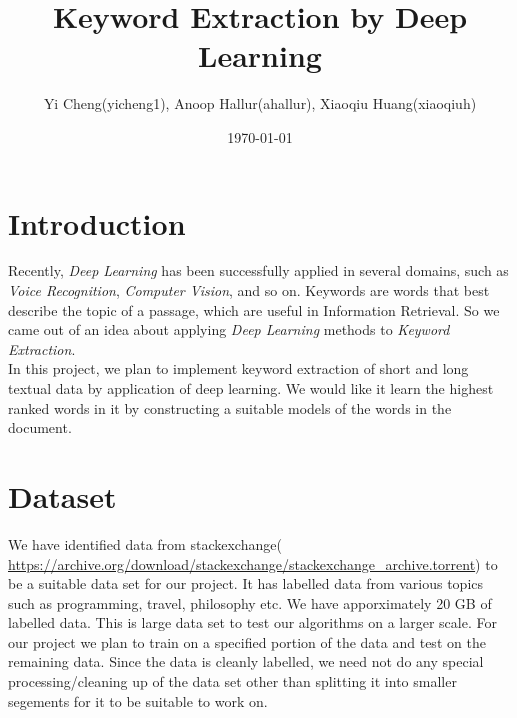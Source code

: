 \documentclass[dvips,12pt]{article}
\begin{document}
	
	
	\title{Keyword Extraction by Deep Learning}
	\author{Yi Cheng(yicheng1), Anoop Hallur(ahallur), Xiaoqiu Huang(xiaoqiuh)}
	\date{\today}
	
	
	\maketitle
	
	
	\section{Introduction}
		Recently, \emph{Deep Learning} has been successfully applied in several domains, such as \emph{Voice Recognition}, \emph{Computer Vision}, and so on. Keywords are words that best describe the topic of a passage, which are useful in Information Retrieval. So we came out of an idea about applying \emph{Deep Learning} methods to \emph{Keyword Extraction}. \\
        In this project, we plan to implement keyword extraction of short and long textual data by application of deep learning. We would like it learn the highest ranked words in it by constructing a suitable models of the words in the document.

	\section{Dataset}
		We have identified data from stackexchange( \url{https://archive.org/download/stackexchange/stackexchange_archive.torrent}) to be a suitable data set for our project. It has labelled data from various topics such as programming, travel, philosophy etc. We have apporximately 20 GB of labelled data. This is large data set to test our algorithms on a larger scale. For our project we plan to train on a specified portion of the data and test on the remaining data. Since the data is cleanly labelled, we need not do any special processing/cleaning up of the data set other than splitting it into smaller segements for it to be suitable to work on.
        
	
\end{document}
